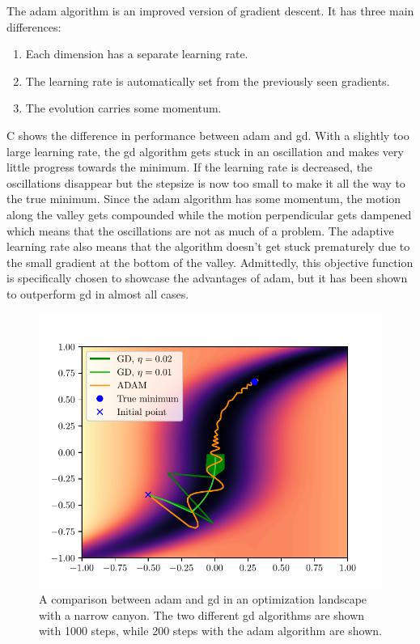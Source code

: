 The \gls{adam} algorithm is an improved version of gradient descent.
It has three main differences:
\begin{enumerate}
	\item Each dimension has a separate learning rate.
	\item The learning rate is automatically set from the previously seen gradients.
	\item The evolution carries some momentum.
\end{enumerate}
C shows the difference in performance between \gls{adam}
and \gls{gd}.
With a slightly too large learning rate, the \gls{gd} algorithm gets stuck in an
oscillation and makes very little progress towards the minimum.
If the learning rate is decreased, the oscillations disappear but the stepsize
is now too small to make it all the way to the true minimum. 
Since the \gls{adam} algorithm has some momentum, the motion along the valley
gets compounded while the motion perpendicular gets dampened which means that
the oscillations are not as much of a problem.
The adaptive learning rate also means that the algorithm doesn't get stuck
prematurely due to the small gradient at the bottom of the valley.
Admittedly, this objective function is specifically chosen to showcase the
advantages of \gls{adam}, but it has been shown to outperform \gls{gd} in almost
all cases.
\begin{figure}[htpb]
	\centering
	\includegraphics{chapters/theory/adam_vs_gd_plot.pdf}
	\caption{
		A comparison between \gls{adam} and \gls{gd} in an optimization
		landscape with a narrow canyon. The two different \gls{gd} algorithms
		are shown with 1000 steps, while 200 steps with the \gls{adam} algorithm
		are shown.
	}
	\label{fig:adam_vs_gd}
\end{figure}

